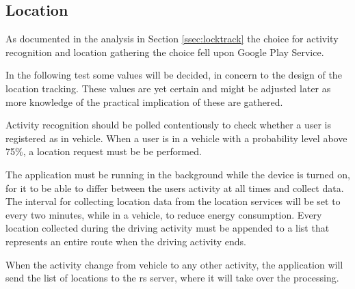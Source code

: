 \subsection{Location}
As documented in the analysis in Section \ref{ssec:locktrack} the choice for activity recognition and location gathering the choice fell upon Google Play Service.

In the following test some values will be decided, in concern to the design of the location tracking. 
These values are yet certain and might be adjusted later as more knowledge of the practical implication of these are gathered. 


Activity recognition should be polled contentiously to check whether a user is registered as in vehicle.
When a user is in a vehicle with a probability level above 75\%, a location request must be be performed.

The application must be running in the background while the device is turned on, for it to be able to differ between the users activity at all times and collect data. 
The interval for collecting location data from the location services will be set to every two minutes, while in a vehicle, to reduce energy consumption. 
Every location collected during the driving activity must be appended to a list that represents an entire route when the driving activity ends.

When the activity change from vehicle to any other activity, the application will send the list of locations to the \gls{rs} server, where it will take over the processing. 